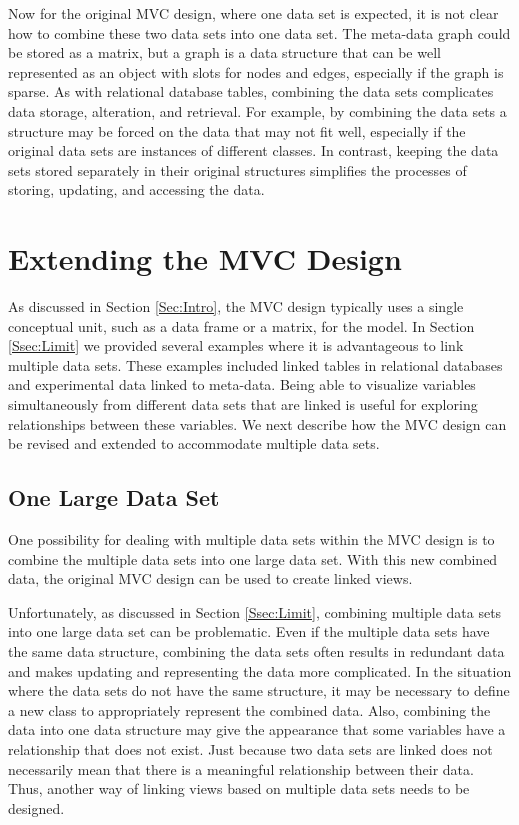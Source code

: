 \documentclass{article}[11pt]
\begin{document}
Now for the original MVC design, where one data set is expected, it is not
clear how to combine these two data sets into one data set.  The meta-data
graph could be stored as a matrix, but a graph is a data structure that can be
well represented as an object with slots for nodes and edges, especially if
the graph is sparse.  As with relational database tables, combining the data
sets complicates data storage, alteration, and retrieval.  For example, by
combining the data sets a structure may be forced on the data that may not fit
well, especially if the original data sets are instances of different classes.
In contrast, keeping the data sets stored separately in their original
structures simplifies the processes of storing, updating, and accessing the
data.   

\section{Extending the MVC Design}\label{Sec:Extend}

As discussed in Section \ref{Sec:Intro}, the MVC design typically uses a single
conceptual unit, such as a data frame or a matrix, for the model.  In Section
\ref{Ssec:Limit} we provided several examples where it is advantageous to link
multiple data sets.  These examples included linked tables in relational
databases and experimental data linked to meta-data.  Being able to visualize
variables simultaneously from different data sets that are linked is useful for
exploring relationships between these variables.  We next describe how the MVC
design can be revised and extended to accommodate multiple data sets. 

\subsection{One Large Data Set}\label{Ssec:OneDS}

One possibility for dealing with multiple data sets within the MVC design is to
combine the multiple data sets into one large data set.  With this new
combined data, the original MVC design can be used to create linked views.

Unfortunately, as discussed in Section \ref{Ssec:Limit}, combining
multiple data sets into one large data set can be problematic.  Even if the
multiple data sets have the same data structure, combining the data sets often
results in redundant data and makes updating and representing the
data more complicated.  In the situation where the data sets do not have the
same structure, it may be necessary to define a new class to appropriately
represent the combined data.  Also, combining the data into one data structure
may give the appearance that some variables have a relationship that does not
exist.  Just because two data sets are linked does not necessarily mean that
there is a meaningful relationship between their data.  Thus, another way
of linking views based on multiple data sets needs to be designed. 
\end{document}
